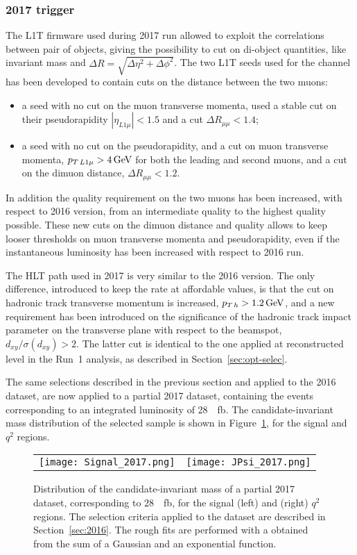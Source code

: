\subsubsection{2017 trigger}
\label{sec:2017}

The L1T firmware used during 2017 run allowed to exploit the correlations between pair of objects, giving the possibility to cut on di-object quantities, like invariant mass and $\Delta R=\sqrt{\Delta\eta^2 + \Delta\phi^2}$.
The two L1T seeds used for the \BtoKstmumu channel has been developed to contain cuts on the distance between the two muons:
\begin{itemize}
\item a seed with no cut on the muon transverse momenta, used a stable cut on their pseudorapidity $|\eta_{L1\mu}|<1.5$ and a cut $\Delta R_{\mu\mu}<1.4$;
\item a seed with no cut on the pseudorapidity, and a cut on muon transverse momenta, $p_{T\,L1\mu}>4\,\textrm{GeV}$ for both the leading and second muons, and a cut on the dimuon distance, $\Delta R_{\mu\mu}<1.2$.
\end{itemize}
In addition the quality requirement on the two muons has been increased, with respect to 2016 version, from an intermediate quality to the highest quality possible.
These new cuts on the dimuon distance and quality allows to keep looser thresholds on muon transverse momenta and pseudorapidity, even if the instantaneous luminosity has been increased with respect to 2016 run.

The HLT path used in 2017 is very similar to the 2016 version.
The only difference, introduced to keep the rate at affordable values, is that the cut on hadronic track transverse momentum is increased, $p_{T\,h}>1.2\,\textrm{GeV}$, and a new requirement has been introduced on the significance of the hadronic track impact parameter on the transverse plane with respect to the beamspot, $d_{xy}/\sigma(d_{xy}) > 2$.
The latter cut is identical to the one applied at reconstructed level in the Run~1 analysis, as described in Section~\ref{sec:opt-selec}.

The same selections described in the previous section and applied to the 2016 dataset, are now applied to a partial 2017 dataset, containing the events corresponding to an integrated luminosity of \SI{28}{\per\femto\barn}.
The candidate-\PBz invariant mass distribution of the selected sample is shown in Figure~\ref{fig:prosp-2017}, for the signal and \JPsi $q^2$ regions.

\begin{figure}[!hbt]
  \centering
  \begin{tabular}{cc}
    \texttt{[image: Signal\_2017.png]} &
    \texttt{[image: JPsi\_2017.png]}
  \end{tabular}
  \caption{Distribution of the candidate-\PBz invariant mass of a partial 2017 dataset, corresponding to \SI{28}{\per\femto\barn}, for the signal (left) and \JPsi (right) $q^2$ regions.
    The selection criteria applied to the dataset are described in Section~\ref{sec:2016}.
    The rough fits are performed with a \pdf obtained from the sum of a Gaussian and an exponential function.
  \label{fig:prosp-2017}}
\end{figure}


